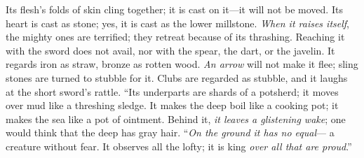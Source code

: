 \begin{biblechapter}
\verse Its flesh’s folds of skin cling together; 
it is cast on it—it will not be moved.
\verse Its heart is cast as stone; 
yes, it is cast as the lower millstone.
\verse \textit{When it raises itself}, the mighty ones are terrified; 
they retreat because of its thrashing.
\verse Reaching it with the sword does not avail, 
nor with the spear, the dart, or the javelin.
\verse It regards iron as straw, 
bronze as rotten wood.
\verse \textit{An arrow} will not make it flee; 
sling stones are turned to stubble for it.
\verse Clubs are regarded as stubble, 
and it laughs at the short sword’s rattle.
\verse “Its underparts are shards of a potsherd; 
it moves over mud like a threshing sledge.
\verse It makes the deep boil like a cooking pot; 
it makes the sea like a pot of ointment.
\verse Behind it, \textit{it leaves a glistening wake}; 
one would think that the deep has gray hair.
\verse “\textit{On the ground it has no equal}— 
a creature without fear.
\verse It observes all the lofty; 
it is king \textit{over all that are proud}.”
\end{biblechapter}

